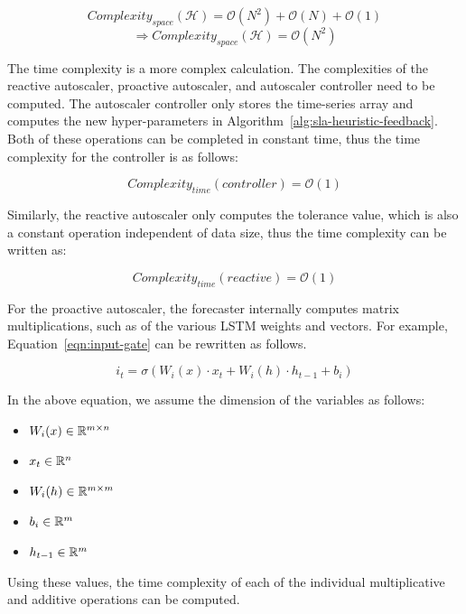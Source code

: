 \[Complexity_{space}(\mathcal{H}) = \mathcal{O}(N^2) + \mathcal{O}(N) + \mathcal{O}(1)\]
\begin{equation}
    \Rightarrow Complexity_{space}(\mathcal{H}) = \mathcal{O}(N^2)
\end{equation}

The time complexity is a more complex calculation. The complexities of the reactive autoscaler, proactive autoscaler, and autoscaler controller need to be computed. The autoscaler controller only stores the time-series array and computes the new hyper-parameters in Algorithm~\ref{alg:sla-heuristic-feedback}. Both of these operations can be completed in constant time, thus the time complexity for the controller is as follows:

\begin{equation}
    Complexity_{time}(controller) = \mathcal{O}(1)
\end{equation}

Similarly, the reactive autoscaler only computes the tolerance value, which is also a constant operation independent of data size, thus the time complexity can be written as:

\begin{equation}
    Complexity_{time}(reactive) = \mathcal{O}(1)
\end{equation}

For the proactive autoscaler, the forecaster internally computes matrix multiplications, such as of the various LSTM weights and vectors. For example, Equation~\ref{eqn:input-gate} can be rewritten as follows.

\begin{equation}
    i_{t} = \sigma(W_{i}(x) \cdot x_{t} + W_{i}(h) \cdot h_{t-1} + b_{i})
\end{equation}

In the above equation, we assume the dimension of the variables as follows:

\begin{itemize}
    \item $W_{i}(x) \in \mathbb{R}^{m \times n}$
    \item $x_{t} \in \mathbb{R}^{n}$
    \item $W_{i}(h) \in \mathbb{R}^{m \times m}$
    \item $b_{i} \in \mathbb{R}^{m}$
    \item $h_{t-1} \in \mathbb{R}^{m}$
\end{itemize}

Using these values, the time complexity of each of the individual multiplicative and additive operations can be computed.

